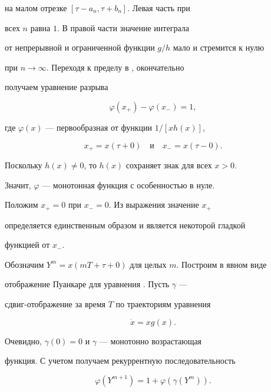 на малом отрезке $[\tau-a_n,\tau+b_n]$. Левая часть  при 


всех $n$ равна $1$. В правой части  значение интеграла 


от непрерывной и ограниченной функции $g/h$ мало и стремится к нулю 


при $n\to\infty$. Переходя к пределу в , окончательно 


получаем уравнение разрыва


\begin{equation}


\varphi(x_+)-\varphi(x_-)=1,


\label{1.4}


\end{equation}


где $\varphi(x)$ --- первообразная от функции $1/[xh(x)]$,


$$


x_+=x(\tau+0)\quad\text{и}\quad x_-=x(\tau-0).


$$


Поскольку $h(x)\ne 0$, то $h(x)$ сохраняет знак для всех $x>0$. 


Значит, $\varphi$ --- монотонная функция с особенностью в нуле. 


Положим $x_+=0$ при $x_-=0$. Из выражения  значение $x_+$ 


определяется единственным образом и является некоторой гладкой 


функцией от $x_-$.





Обозначим $Y^m=x(mT+\tau+0)$ для целых $m$. Построим в явном виде 


отображение Пуанкаре для уравнения . Пусть $\gamma$ --- 


сдвиг-отображение за время $T$ по траекториям уравнения


$$


\Dot x=xg(x).


$$


Очевидно, $\gamma(0)=0$ и $\gamma$ --- монотонно возрастающая 


функция. С учетом  получаем рекуррентную последовательность


\begin{equation}


\varphi(Y^{m+1})=1+\varphi(\gamma(Y^m)).


\label{1.5}


\end{equation}





